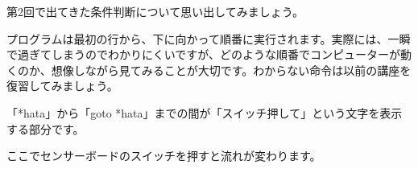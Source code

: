 
第2回で出てきた条件判断について思い出してみましょう。

プログラムは最初の行から、下に向かって順番に実行されます。実際には、一瞬で過ぎてしまうのでわかりにくいですが、どのような順番でコンピューターが動くのか、想像しながら見てみることが大切です。わからない命令は以前の講座を復習してみましょう。

「*hata」から「goto *hata」までの間が「スイッチ押して」という文字を表示する部分です。




\begin{description}
    \item {}
    \item {}
    \item {}
    \item {}
    \item {}
    \item {}
    \item {}
    \item {}
    \item {}
    \item {}
\end{description}

ここでセンサーボードのスイッチを押すと流れが変わります。

\begin{description}
    \item {}
    \item {}
    \item {}
    \item {}
    \item {}
    \item {}
    \item {}
    \item {}
    \item {}
    \item {}
\end{description}


